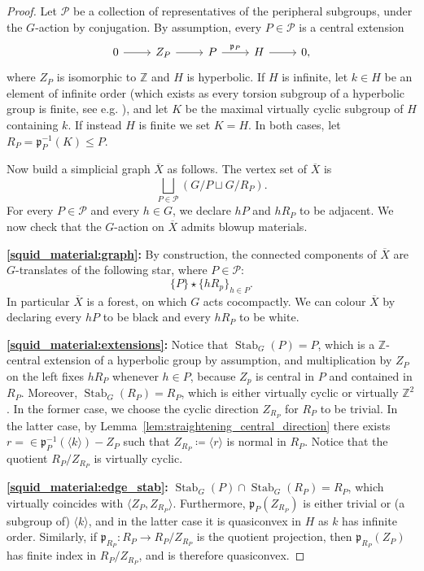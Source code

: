 \documentclass[svgnames]{amsart}
\theoremstyle{plain}
\theoremstyle{definition}
\newcommand{\Z}{\mathbb{Z}}
\newcommand{\ov}[1]{\overline{#1}}
\newcommand{\Stab}[2]{\operatorname{Stab}_{#1}(#2)}
\newcommand{\p}{\mathfrak{p}}
\begin{document}
\begin{proof}
Let $\mathcal{P}$ be a collection of representatives of the peripheral subgroups, under the $G$-action by conjugation. By assumption, every $P\in \mathcal{P}$ is a central extension
$$\begin{tikzcd}
    0\ar{r}&Z_P\ar{r}&P\ar{r}{\p_P}&H\ar{r}&0,
\end{tikzcd}$$
where $Z_P$ is isomorphic to $\Z$ and $H$ is hyperbolic. If $H$ is infinite, let $k\in H$ be an element of infinite order (which exists as every torsion subgroup of a hyperbolic group is finite, see e.g. \cite[Corollary 8.36]{GroupesHyperboliques}), and let $K$ be the maximal virtually cyclic subgroup of $H$ containing $k$. If instead $H$ is finite we set $K=H$. In both cases, let $R_P=\p_P^{-1}(K)\le P$.

Now build a simplicial graph $\ov X$ as follows. The vertex set of $\ov X$ is
$$\bigsqcup_{P\in \mathcal P} \left(G/P\sqcup G/R_P\right).$$
For every $P\in \mathcal P$ and every $h\in G$, we declare $hP$ and $hR_P$ to be adjacent. We now check that the $G$-action on $\ov X$ admits blowup materials.


\par\medskip
\textbf{\eqref{squid_material:graph}:} By construction, the connected components of $\ov X$ are $G$-translates of the following star, where $P\in \mathcal P$:
$$\{P\}\star\{hR_p\}_{h\in P}.$$
In particular $\ov X$ is a forest, on which $G$ acts cocompactly. We can colour $\ov X$ by declaring every $hP$ to be black and every $hR_P$ to be white.

\par\medskip
\textbf{\eqref{squid_material:extensions}:} Notice that $\Stab{G}{P}=P$, which is a $\Z$-central extension of a hyperbolic group by assumption, and multiplication by $Z_P$ on the left fixes $hR_P$ whenever $h\in P$, because $Z_p$ is central in $P$ and contained in $R_P$. Moreover, $\Stab{G}{R_P}=R_P$, which is either virtually cyclic or virtually $\Z^2$. In the former case, we choose the cyclic direction $Z_{R_P}$ for ${R_P}$ to be trivial. In the latter case, by Lemma~\ref{lem:straightening_central_direction} there exists $r=\in \p_P^{-1}(\langle k\rangle)-Z_P$ such that $Z_{R_P}\coloneq \langle r\rangle$ is normal in ${R_P}$. Notice that the quotient ${R_P}/Z_{R_P}$ is virtually cyclic. 

\par\medskip
\textbf{\eqref{squid_material:edge_stab}:} $\Stab{G}{P}\cap \Stab{G}{{R_P}}={R_P}$, which virtually coincides with $\langle Z_P, Z_{R_P}\rangle$. Furthermore, $\p_P(Z_{R_P})$ is either trivial or (a subgroup of) $\langle k\rangle$, and in the latter case it is quasiconvex in $H$ as $k$ has infinite order. Similarly, if $\p_{R_P}\colon {R_P}\to {R_P}/Z_{R_P}$ is the quotient projection, then $\p_{R_P}(Z_P)$ has finite index in ${R_P}/Z_{R_P}$, and is therefore quasiconvex.


\end{proof}
\end{document}
